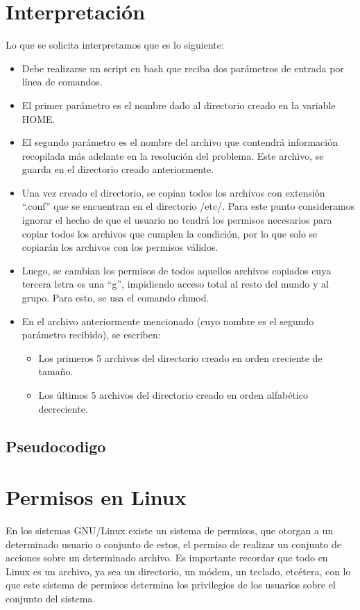 \documentclass[12pt,a4paper]{article} %
\begin{document}
	\section{Interpretación}
	Lo que se solicita interpretamos que es lo siguiente:
	\begin{itemize}
		\item Debe realizarse un script en bash que reciba dos parámetros de entrada por línea de comandos.
		\item El primer parámetro es el nombre dado al directorio creado en la variable HOME.
		\item El segundo parámetro es el nombre del archivo que contendrá información recopilada más adelante en la resolución del problema. Este archivo, se guarda en el directorio creado anteriormente.
		\item Una vez creado el directorio,  se copian todos los archivos con extensión “.conf” que se encuentran en el directorio /etc/. Para este punto consideramos ignorar el hecho de que el usuario no tendrá los permisos necesarios para copiar todos los archivos que cumplen la condición, por lo que solo se copiarán los archivos con los permisos válidos.
		\item Luego, se cambian los permisos de todos aquellos archivos copiados cuya tercera letra es una “g”, impidiendo acceso total al resto del mundo y al grupo. Para esto, se usa el comando chmod.
		\item En el archivo anteriormente mencionado (cuyo nombre es el segundo parámetro recibido), se escriben: 
		\begin{itemize}
			\item Los primeros 5 archivos del directorio creado en orden creciente de tamaño.
			\item Los últimos 5 archivos del directorio creado en orden alfabético decreciente.
		\end{itemize}
	\end{itemize}
	\clearpage
	\subsection{Pseudocodigo}
	\lstset{inputencoding=utf8/latin1, style = customc}
    
	\section{Permisos en Linux}
	En los sistemas GNU/Linux existe un sistema de permisos, que otorgan a un determinado usuario o conjunto de estos, el permiso de realizar un conjunto de acciones sobre un determinado archivo. Es importante recordar que todo en Linux es un archivo, ya sea un directorio, un módem, un teclado, etcétera, con lo que este sistema de permisos determina los privilegios de los usuarios sobre el conjunto del sistema.\par
\end{document}
